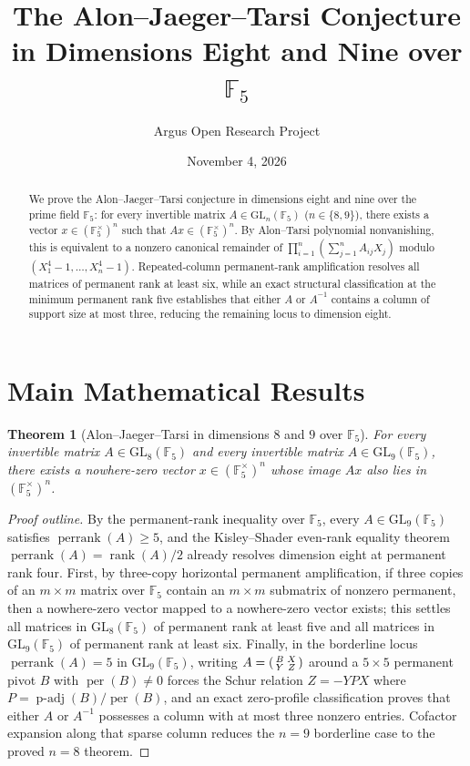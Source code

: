\documentclass[10pt,reqno]{amsart}
\title[Alon--Jaeger--Tarsi Conjecture in Dimensions 8 and 9 over F5]
{The Alon--Jaeger--Tarsi Conjecture in Dimensions Eight and Nine over $\mathbb{F}_5$}
\author{Argus Open Research Project}
\date{November 4, 2026}
\newtheorem{theorem}{Theorem}[section]
\theoremstyle{definition}
\begin{document}
\begin{abstract}
We prove the Alon--Jaeger--Tarsi conjecture in dimensions eight and nine over the prime field $\mathbb{F}_5$: for every invertible matrix $A \in \mathrm{GL}_n(\mathbb{F}_5)$ ($n \in \{8,9\}$), there exists a vector $x \in (\mathbb{F}_5^\times)^n$ such that $Ax \in (\mathbb{F}_5^\times)^n$. By Alon--Tarsi polynomial nonvanishing, this is equivalent to a nonzero canonical remainder of $\prod_{i=1}^n (\sum_{j=1}^n A_{ij} X_j)$ modulo $(X_1^4-1,\ldots,X_n^4-1)$. Repeated-column permanent-rank amplification resolves all matrices of permanent rank at least six, while an exact structural classification at the minimum permanent rank five establishes that either $A$ or $A^{-1}$ contains a column of support size at most three, reducing the remaining locus to dimension eight.
\end{abstract}
\maketitle

\section{Main Mathematical Results}
\begin{theorem}[Alon--Jaeger--Tarsi in dimensions $8$ and $9$ over $\mathbb{F}_5$]
For every invertible matrix $A \in \mathrm{GL}_8(\mathbb{F}_5)$ and every invertible matrix $A \in \mathrm{GL}_9(\mathbb{F}_5)$, there exists a nowhere-zero vector $x \in (\mathbb{F}_5^\times)^n$ whose image $Ax$ also lies in $(\mathbb{F}_5^\times)^n$.
\end{theorem}
\begin{proof}[Proof outline]
By the permanent-rank inequality over $\mathbb{F}_5$, every $A \in \mathrm{GL}_9(\mathbb{F}_5)$ satisfies $\operatorname{perrank}(A) \ge 5$, and the Kisley--Shader even-rank equality theorem $\operatorname{perrank}(A)=\operatorname{rank}(A)/2$ already resolves dimension eight at permanent rank four. First, by three-copy horizontal permanent amplification, if three copies of an $m\times m$ matrix over $\mathbb{F}_5$ contain an $m\times m$ submatrix of nonzero permanent, then a nowhere-zero vector mapped to a nowhere-zero vector exists; this settles all matrices in $\mathrm{GL}_8(\mathbb{F}_5)$ of permanent rank at least five and all matrices in $\mathrm{GL}_9(\mathbb{F}_5)$ of permanent rank at least six. Finally, in the borderline locus $\operatorname{perrank}(A)=5$ in $\mathrm{GL}_9(\mathbb{F}_5)$, writing $A=\begin{psmallmatrix}B&X\\Y&Z\end{psmallmatrix}$ around a $5\times 5$ permanent pivot $B$ with $\operatorname{per}(B)\neq 0$ forces the Schur relation $Z=-YPX$ where $P=\operatorname{p-adj}(B)/\operatorname{per}(B)$, and an exact zero-profile classification proves that either $A$ or $A^{-1}$ possesses a column with at most three nonzero entries. Cofactor expansion along that sparse column reduces the $n=9$ borderline case to the proved $n=8$ theorem.
\end{proof}
\end{document}
